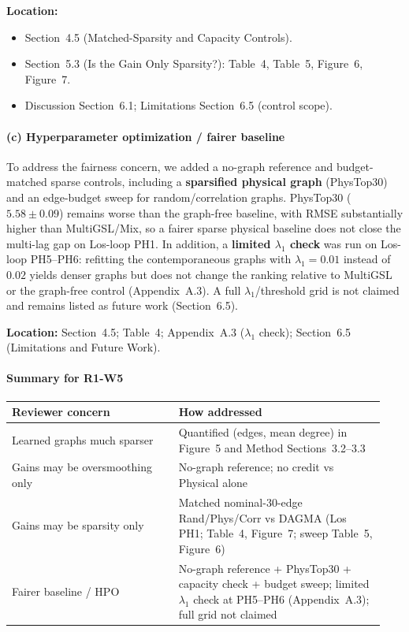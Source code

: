 \documentclass[a4paper,11pt]{article}
\begin{document}
{\textbf{Location:}
\begin{itemize}
    \item Section~4.5 (Matched-Sparsity and Capacity Controls).
    \item Section~5.3 (Is the Gain Only Sparsity?): Table~4, Table~5, Figure~6, Figure~7.
    \item Discussion Section~6.1; Limitations Section~6.5 (control scope).
\end{itemize}

\paragraph{(c) Hyperparameter optimization / fairer baseline}
To address the fairness concern, we added a no-graph reference and budget-matched sparse controls, including a \textbf{sparsified physical graph} (PhysTop30) and an edge-budget sweep for random/correlation graphs. PhysTop30 ($5.58\pm 0.09$) remains worse than the graph-free baseline, with RMSE substantially higher than MultiGSL/Mix, so a fairer sparse physical baseline does not close the multi-lag gap on Los-loop PH1. In addition, a \textbf{limited $\lambda_1$ check} was run on Los-loop PH5--PH6: refitting the contemporaneous graphs with $\lambda_1=0.01$ instead of $0.02$ yields denser graphs but does not change the ranking relative to MultiGSL or the graph-free control (Appendix~A.3). A full $\lambda_1$/threshold grid is not claimed and remains listed as future work (Section~6.5).

\textbf{Location:} Section~4.5; Table~4; Appendix~A.3 ($\lambda_1$ check); Section~6.5 (Limitations and Future Work).

\paragraph{Summary for R1-W5}
\begin{center}
\small
\begin{tabular}{p{0.42\linewidth}p{0.52\linewidth}}
\toprule
Reviewer concern & How addressed \\
\midrule
Learned graphs much sparser & Quantified (edges, mean degree) in Figure~5 and Method Sections~3.2--3.3 \\
Gains may be oversmoothing only & No-graph reference; no credit vs Physical alone \\
Gains may be sparsity only & Matched nominal-$30$-edge Rand/Phys/Corr vs DAGMA (Los PH1; Table~4, Figure~7; sweep Table~5, Figure~6) \\
Fairer baseline / HPO & No-graph reference + PhysTop30 + capacity check + budget sweep; limited $\lambda_1$ check at PH5--PH6 (Appendix~A.3); full grid not claimed \\
\bottomrule
\end{tabular}
\end{center}
}
\end{document}
